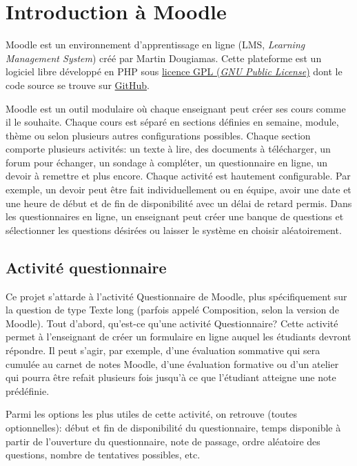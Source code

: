 \chapter{Introduction à Moodle}

Moodle est un environnement d'apprentissage en ligne (LMS, \textit{Learning Management System}) créé par Martin Dougiamas.
Cette plateforme est un logiciel libre développé en PHP sous \href{http://docs.moodle.org/dev/License}{licence GPL (\textit{GNU Public License})} dont le code source se trouve sur \href{https://github.com/moodle/moodle}{GitHub}.

Moodle est un outil modulaire où chaque enseignant peut créer ses cours comme il le souhaite.
Chaque cours est séparé en sections définies en semaine, module, thème ou selon plusieurs autres configurations possibles.
Chaque section comporte plusieurs activités: un texte à lire, des documents à télécharger, un forum pour échanger, un sondage à compléter, un questionnaire en ligne, un devoir à remettre et plus encore.
Chaque activité est hautement configurable.
Par exemple, un devoir peut être fait individuellement ou en équipe, avoir une date et une heure de début et de fin de disponibilité avec un délai de retard permis.
Dans les questionnaires en ligne, un enseignant peut créer une banque de questions et sélectionner les questions désirées ou laisser le système en choisir aléatoirement.

\section{Activité questionnaire}

Ce projet s'attarde à l'activité Questionnaire de Moodle, plus spécifiquement sur la question de type Texte long (parfois appelé Composition, selon la version de Moodle).
Tout d'abord, qu'est-ce qu'une activité Questionnaire?
Cette activité permet à l'enseignant de créer un formulaire en ligne auquel les étudiants devront répondre.
Il peut s'agir, par exemple, d'une évaluation sommative qui sera cumulée au carnet de notes Moodle, d'une évaluation formative ou d'un atelier qui pourra être refait plusieurs fois jusqu'à ce que l'étudiant atteigne une note prédéfinie.

Parmi les options les plus utiles de cette activité, on retrouve (toutes optionnelles): début et fin de disponibilité du questionnaire, temps disponible à partir de l'ouverture du questionnaire, note de passage, ordre aléatoire des questions, nombre de tentatives possibles, etc.


